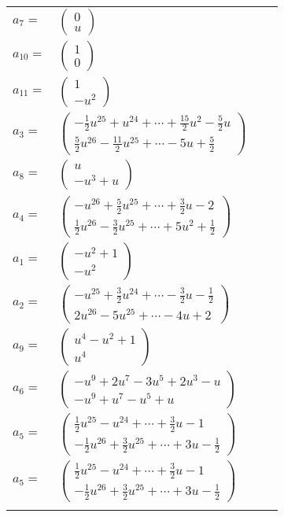 \documentclass[1p]{elsarticle_modified}
\theoremstyle{definition}
\begin{document}
\begin{tabular}{m{7pt} m{180pt} m{7pt} m{180pt} }
\flushright $a_{7}=$&$\begin{pmatrix}0\\u\end{pmatrix}$ \\
\flushright $a_{10}=$&$\begin{pmatrix}1\\0\end{pmatrix}$ \\
\flushright $a_{11}=$&$\begin{pmatrix}1\\- u^2\end{pmatrix}$ \\
\flushright $a_{3}=$&$\begin{pmatrix}-\frac{1}{2} u^{25}+u^{24}+\cdots+\frac{15}{2} u^2-\frac{5}{2} u\\\frac{5}{2} u^{26}-\frac{11}{2} u^{25}+\cdots-5 u+\frac{5}{2}\end{pmatrix}$ \\
\flushright $a_{8}=$&$\begin{pmatrix}u\\- u^3+u\end{pmatrix}$ \\
\flushright $a_{4}=$&$\begin{pmatrix}- u^{26}+\frac{5}{2} u^{25}+\cdots+\frac{3}{2} u-2\\\frac{1}{2} u^{26}-\frac{3}{2} u^{25}+\cdots+5 u^2+\frac{1}{2}\end{pmatrix}$ \\
\flushright $a_{1}=$&$\begin{pmatrix}- u^2+1\\- u^2\end{pmatrix}$ \\
\flushright $a_{2}=$&$\begin{pmatrix}- u^{25}+\frac{3}{2} u^{24}+\cdots-\frac{3}{2} u-\frac{1}{2}\\2 u^{26}-5 u^{25}+\cdots-4 u+2\end{pmatrix}$ \\
\flushright $a_{9}=$&$\begin{pmatrix}u^4- u^2+1\\u^4\end{pmatrix}$ \\
\flushright $a_{6}=$&$\begin{pmatrix}- u^9+2 u^7-3 u^5+2 u^3- u\\- u^9+u^7- u^5+u\end{pmatrix}$ \\
\flushright $a_{5}=$&$\begin{pmatrix}\frac{1}{2} u^{25}- u^{24}+\cdots+\frac{3}{2} u-1\\-\frac{1}{2} u^{26}+\frac{3}{2} u^{25}+\cdots+3 u-\frac{1}{2}\end{pmatrix}$\\ \flushright $a_{5}=$&$\begin{pmatrix}\frac{1}{2} u^{25}- u^{24}+\cdots+\frac{3}{2} u-1\\-\frac{1}{2} u^{26}+\frac{3}{2} u^{25}+\cdots+3 u-\frac{1}{2}\end{pmatrix}$\\&\end{tabular}
\end{document}
